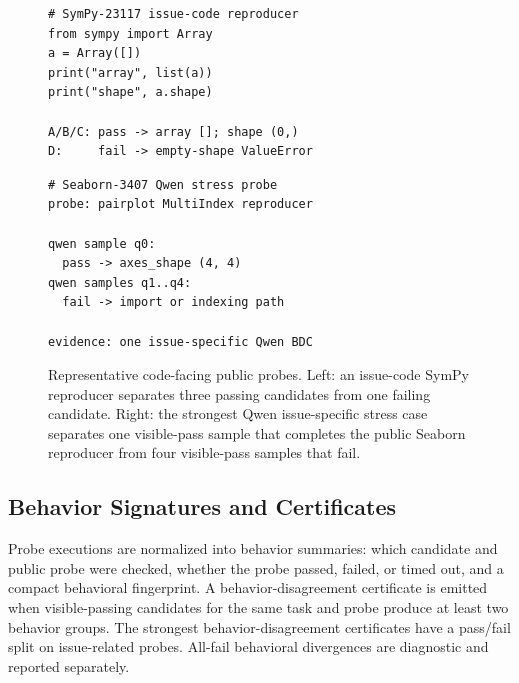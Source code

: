 \documentclass[conference]{IEEEtran}
\newcommand{\bdc}{behavior-disagreement certificate\xspace}
\newcommand{\bdcs}{behavior-disagreement certificates\xspace}
\newcommand{\Description}[1]{}
\begin{document}
\begin{figure}[t]
\begin{minipage}[t]{0.49\textwidth}
\begin{lstlisting}[style=patchcourtpatch]
# SymPy-23117 issue-code reproducer
from sympy import Array
a = Array([])
print("array", list(a))
print("shape", a.shape)

A/B/C: pass -> array []; shape (0,)
D:     fail -> empty-shape ValueError
\end{lstlisting}
\end{minipage}\hfill
\begin{minipage}[t]{0.49\textwidth}
\begin{lstlisting}[style=patchcourtpatch]
# Seaborn-3407 Qwen stress probe
probe: pairplot MultiIndex reproducer

qwen sample q0:
  pass -> axes_shape (4, 4)
qwen samples q1..q4:
  fail -> import or indexing path

evidence: one issue-specific Qwen BDC
\end{lstlisting}
\end{minipage}
  \caption{Representative code-facing public probes. Left: an issue-code SymPy reproducer separates three passing candidates from one failing candidate. Right: the strongest Qwen issue-specific stress case separates one visible-pass sample that completes the public Seaborn reproducer from four visible-pass samples that fail.}
  \Description{Two code-like probe panels. The SymPy panel constructs an empty Array and records three passing candidates and one empty-shape failure. The Seaborn panel records one Qwen sample passing with axes shape 4 by 4 and four Qwen samples failing through import or indexing paths.}
  \label{fig:probe-code-cards}
\end{figure}

\subsection{Behavior Signatures and Certificates}

Probe executions are normalized into behavior summaries: which candidate and public probe were checked, whether the probe passed, failed, or timed out, and a compact behavioral fingerprint.
A \bdc is emitted when visible-passing candidates for the same task and probe produce at least two behavior groups.
The strongest \bdcs have a pass/fail split on issue-related probes.
All-fail behavioral divergences are diagnostic and reported separately.
\end{document}
